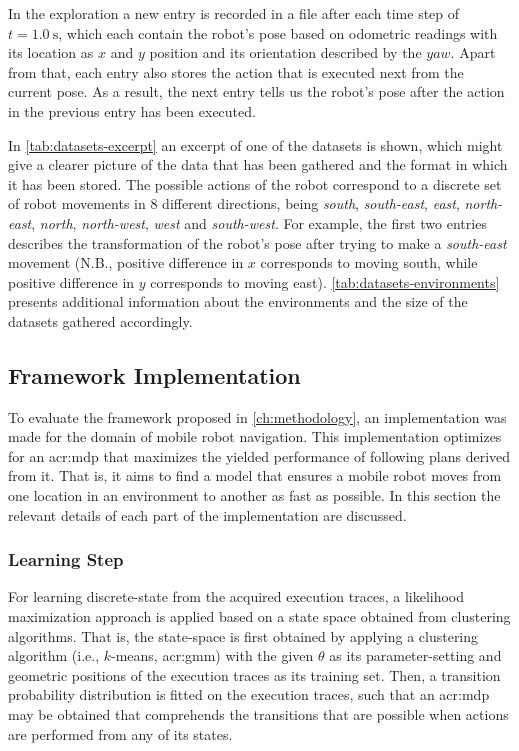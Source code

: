 In the exploration a new entry is recorded in a file after each time step of $t = \SI{1.0}{\second}$, which each contain the robot's pose based on odometric readings with its location as $x$ and $y$ position and its orientation described by the $yaw$.
Apart from that, each entry also stores the action that is executed next from the current pose.
As a result, the next entry tells us the robot's pose after the action in the previous entry has been executed.

In \autoref{tab:datasets-excerpt} an excerpt of one of the datasets is shown, which might give a clearer picture of the data that has been gathered and the format in which it has been stored.
The possible actions of the robot correspond to a discrete set of robot movements in $8$ different directions, being \textit{south}, \textit{south-east}, \textit{east}, \textit{north-east}, \textit{north}, \textit{north-west}, \textit{west} and \textit{south-west}.
For example, the first two entries describes the transformation of the robot's pose after trying to make a \textit{south-east} movement (N.B., positive difference in $x$ corresponds to moving south, while positive difference in $y$ corresponds to moving east).
\autoref{tab:datasets-environments} presents additional information about the environments and the size of the datasets gathered accordingly.


\subsection{Framework Implementation}
\label{sec:implementation}

To evaluate the framework proposed in \autoref{ch:methodology}, an implementation was made for the domain of mobile robot navigation.
This implementation optimizes for an \acrshort{acr:mdp} that maximizes the yielded performance of following plans derived from it. That is, it aims to find a model that ensures a mobile robot moves from one location in an environment to another as fast as possible.
In this section the relevant details of each part of the implementation are discussed.

\subsubsection{Learning Step}

For learning discrete-state  from the acquired execution traces, a likelihood maximization approach is applied based on a state space obtained from clustering algorithms.
That is, the state-space is first obtained by applying a clustering algorithm (i.e., $k$-means, \acrshort{acr:gmm}) with the given $\theta$ as its parameter-setting and geometric positions of the execution traces as its training set.
Then, a transition probability distribution is fitted on the execution traces, such that an \acrshort{acr:mdp} may be obtained that comprehends the transitions that are possible when actions are performed from any of its states.


